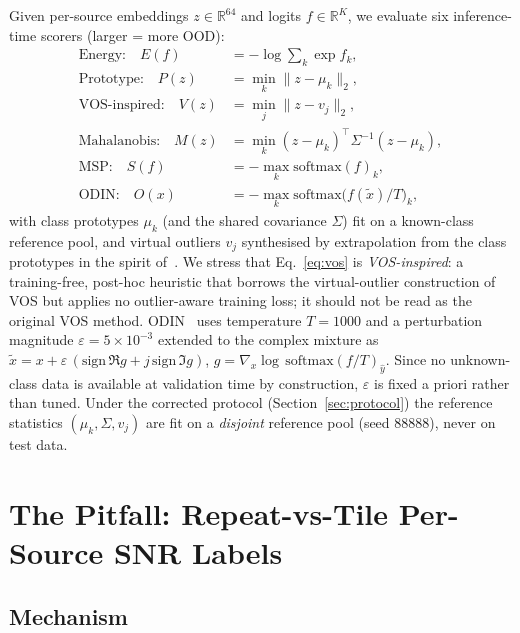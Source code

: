 \documentclass[review,12pt]{elsarticle}
\begin{document}
Given per-source embeddings $z \in \mathbb{R}^{64}$ and logits
$f \in \mathbb{R}^{K}$, we evaluate six inference-time scorers (larger
= more OOD):
\begin{align}
  \text{Energy:}\quad
    E(f) &= -\log\textstyle\sum_k \exp f_k, \label{eq:energy}\\
  \text{Prototype:}\quad
    P(z) &= \min_k \| z - \mu_k \|_2, \label{eq:proto}\\
  \text{VOS-inspired:}\quad
    V(z) &= \min_j \| z - v_j \|_2, \label{eq:vos}\\
  \text{Mahalanobis:}\quad
    M(z) &= \min_k (z - \mu_k)^{\top} \Sigma^{-1} (z - \mu_k),
    \label{eq:maha}\\
  \text{MSP:}\quad
    S(f) &= -\max_k \mathrm{softmax}(f)_k, \label{eq:msp}\\
  \text{ODIN:}\quad
    O(x) &= -\max_k \mathrm{softmax}\!\big(f(\tilde{x}) / T\big)_k,
    \label{eq:odin}
\end{align}
with class prototypes $\mu_k$ (and the shared covariance $\Sigma$) fit
on a known-class reference pool, and virtual outliers $v_j$ synthesised
by extrapolation from the class prototypes in the spirit
of~\cite{du2022vos}. We stress that Eq.~\eqref{eq:vos} is
\emph{VOS-inspired}: a training-free, post-hoc heuristic that borrows
the virtual-outlier construction of VOS but applies no outlier-aware
training loss; it should not be read as the original VOS method.
ODIN~\cite{liang2018odin} uses temperature $T = 1000$ and a
perturbation magnitude $\varepsilon = 5\times10^{-3}$ extended to the
complex mixture as
$\tilde{x} = x + \varepsilon\,(\mathrm{sign}\,\Re g + j\,\mathrm{sign}\,\Im g)$,
$g = \nabla_x \log\,\mathrm{softmax}(f/T)_{\hat{y}}$. Since no
unknown-class data is available at validation time by construction,
$\varepsilon$ is fixed a priori rather than tuned. Under the corrected
protocol (Section~\ref{sec:protocol}) the reference statistics
$(\mu_k, \Sigma, v_j)$ are fit on a \emph{disjoint} reference pool
(seed 88888), never on test data.

\section{The Pitfall: Repeat-vs-Tile Per-Source SNR Labels}
\label{sec:pitfall}

\subsection{Mechanism}
\end{document}
